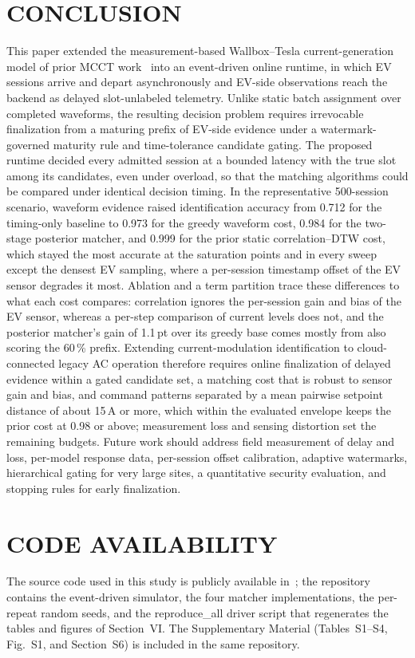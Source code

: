\documentclass{ieeeaccess}
\newif\ifhighlight \highlightfalse
\DeclareRobustCommand{\revised}[1]{\ifhighlight{\color{blue}#1}\else{\color{.}#1}\fi}
\begin{document}
    \section{CONCLUSION}
     This paper extended the measurement-based Wallbox--Tesla current-generation model of prior MCCT work~\cite{b14} into an event-driven online runtime, in which EV sessions arrive and depart asynchronously and EV-side observations reach the backend as delayed \revised{slot-unlabeled} telemetry.
    Unlike static batch assignment over completed waveforms, the resulting decision problem requires irrevocable finalization from a maturing prefix of EV-side evidence under a watermark-governed maturity rule and time-tolerance candidate gating.
    \revised{The proposed runtime decided every admitted session at a bounded latency with the true slot among its candidates, even under overload, so that the matching algorithms could be compared under identical decision timing.
    In the representative 500-session scenario, waveform evidence raised identification accuracy from 0.712 for the timing-only baseline to 0.973 for the greedy waveform cost, 0.984 for the two-stage posterior matcher, and 0.999 for the prior static correlation--DTW cost, which stayed the most accurate at the saturation points and in every sweep except the densest EV sampling, where a per-session timestamp offset of the EV sensor degrades it most.
    Ablation and a term partition trace these differences to what each cost compares: correlation ignores the per-session gain and bias of the EV sensor, whereas a per-step comparison of current levels does not, and the posterior matcher's gain of 1.1\,pt over its greedy base comes mostly from also scoring the 60\,\% prefix.
    Extending current-modulation identification to cloud-connected legacy AC operation therefore requires online finalization of delayed evidence within a gated candidate set, a matching cost that is robust to sensor gain and bias, and command patterns separated by a mean pairwise setpoint distance of about 15\,A or more, which within the evaluated envelope keeps the prior cost at 0.98 or above; measurement loss and sensing distortion set the remaining budgets.
    Future work should address field measurement of delay and loss, per-model response data, per-session offset calibration, adaptive watermarks, hierarchical gating for very large sites, a quantitative security evaluation, and stopping rules for early finalization.}

    \section*{CODE AVAILABILITY}
    The source code used in this study is publicly available \revised{in~\cite{bcode}}; the repository contains the event-driven simulator, the four matcher implementations, the per-repeat random seeds, and the \revised{\mbox{reproduce\_all}} driver script that regenerates \revised{the tables and figures of Section~VI. The Supplementary Material (Tables~S1--S4, Fig.~S1, and Section~S6) is included in the same repository.}
\end{document}
